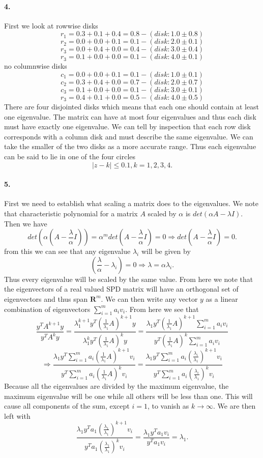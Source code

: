 \documentclass[12pt]{article}
\begin{document}
\paragraph{4.}
	First we look at rowwise  disks
	\[
	r_1 = 0.3 + 0.1 + 0.4 = 0.8 - (disk: 1.0 \pm 0.8)
	\]\[
	r_2 = 0.0 + 0.0 + 0.1 = 0.1 - (disk: 2.0 \pm 0.1)
	\]\[
	r_3 = 0.0 + 0.4 + 0.0 = 0.4 - (disk: 3.0 \pm 0.4)
	\]\[
	r_3 = 0.1 + 0.0 + 0.0 = 0.1 - (disk: 4.0 \pm 0.1)
	\]
	no columnwise disks
	\[
	c_1 = 0.0 + 0.0 + 0.1 = 0.1 - (disk: 1.0 \pm 0.1)
	\]\[
	c_2 = 0.3 + 0.4 + 0.0 = 0.7 - (disk: 2.0 \pm 0.7)
	\]\[
	c_3 = 0.1 + 0.0 + 0.0 = 0.1 - (disk: 3.0 \pm 0.1)
	\]\[
	r_3 = 0.4 + 0.1 + 0.0 = 0.5 - (disk: 4.0 \pm 0.5)
	\]
	There are four disjointed disks which means that each one should contain at least one eigenvalue. The matrix can have at most four eigenvalues and thus each disk must have exactly one eigenvalue. We can tell by inspection that each row disk corresponds with a column disk and must describe the same eigenvalue. We can take the smaller of the two disks as a more accurate range. Thus each eigenvalue can be said to lie in one of the four circles
	\[
	|z-k| \le 0.1, k = 1,2,3,4.
	\]

\paragraph{5.}
	First we need to establish what scaling a matrix does to the eigenvalues. We note that characteristic polynomial for a matrix $A$ scaled by $\alpha$ is $det(\alpha A - \lambda I)$. Then we have 
	\[
	det(\alpha (A - \frac{\lambda}{\alpha}I)) = \alpha^m det(A - \frac{\lambda}{\alpha}I) = 0
	\Rightarrow det(A - \frac{\lambda}{\alpha}I) = 0.
	\]
	from this we can see that any eigenvalue $\lambda_i$ will be given by 
	\[
	\left(\frac{\lambda}{\alpha} - \lambda_i\right) = 0 \Rightarrow \lambda = \alpha \lambda_i.
	\]
	Thus every eigenvalue will be scaled by the same value. From here we note that the eigenvectors of a real valued SPD matrix will have an orthogonal set of eigenvectors and thus span $\mathbf{R}^m$. We can then write any vector $y$ as a linear combination of eigenvectors $\sum_{i=1}^{m} a_iv_i$. From here we see that
	\[
	\frac{y^TA^{k+1}y}{y^TA^{k}y} = 
	\frac{\lambda_1^{k+1}y^T(\frac{1}{\lambda_1}A)^{k+1}y}{\lambda_1^ky^T(\frac{1}{\lambda_1}A)^{k}y} =
	\frac{\lambda_1y^T(\frac{1}{\lambda_1}A)^{k+1}\sum_{i=1}^{m} a_iv_i}{y^T(\frac{1}{\lambda_1}A)^{k}\sum_{i=1}^{m} a_iv_i}
	\]\[
	\Rightarrow 
	\frac{\lambda_1y^T\sum_{i=1}^{m} a_i(\frac{1}{\lambda_1}A)^{k+1}v_i}{y^T\sum_{i=1}^{m} a_i(\frac{1}{\lambda_1}A)^{k}v_i} = 
	\frac{\lambda_1y^T\sum_{i=1}^{m} a_i(\frac{\lambda_i}{\lambda_1})^{k+1}v_i}{y^T\sum_{i=1}^{m} a_i(\frac{\lambda_i}{\lambda_1})^{k}v_i}
	\]
	Because all the eigenvalues are divided by the maximum eigenvalue, the maximum eigenvalue will be one while all others will be less than one. This will cause all components of the sum, except $i=1$, to vanish as $k \rightarrow \infty$. We are then left with
	\[
	\frac{\lambda_1y^Ta_1(\frac{\lambda_1}{\lambda_1})^{k+1}v_i}{y^T a_1(\frac{\lambda_1}{\lambda_1})^{k}v_i}
	= \frac{\lambda_1y^Ta_1v_i}{y^T a_1v_i} = \lambda_1.
	\]
	
\end{document}
